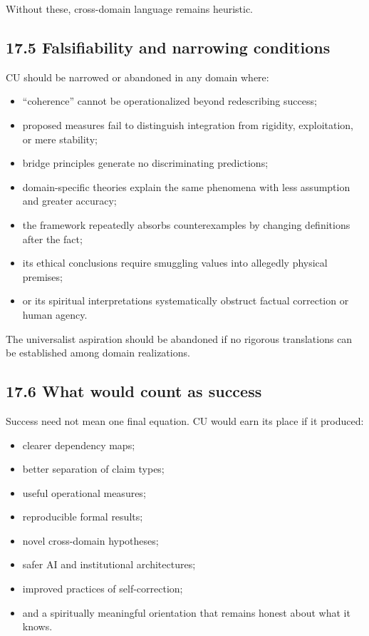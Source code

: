 \documentclass[
  11pt,
]{article}
\providecommand{\tightlist}{%
  \setlength{\itemsep}{0pt}\setlength{\parskip}{0pt}}
\begin{document}
Without these, cross-domain language remains heuristic.

\subsection{17.5 Falsifiability and narrowing
conditions}\label{falsifiability-and-narrowing-conditions}

CU should be narrowed or abandoned in any domain where:

\begin{itemize}
\tightlist
\item
  ``coherence'' cannot be operationalized beyond redescribing success;
\item
  proposed measures fail to distinguish integration from rigidity,
  exploitation, or mere stability;
\item
  bridge principles generate no discriminating predictions;
\item
  domain-specific theories explain the same phenomena with less
  assumption and greater accuracy;
\item
  the framework repeatedly absorbs counterexamples by changing
  definitions after the fact;
\item
  its ethical conclusions require smuggling values into allegedly
  physical premises;
\item
  or its spiritual interpretations systematically obstruct factual
  correction or human agency.
\end{itemize}

The universalist aspiration should be abandoned if no rigorous
translations can be established among domain realizations.

\subsection{17.6 What would count as
success}\label{what-would-count-as-success}

Success need not mean one final equation. CU would earn its place if it
produced:

\begin{itemize}
\tightlist
\item
  clearer dependency maps;
\item
  better separation of claim types;
\item
  useful operational measures;
\item
  reproducible formal results;
\item
  novel cross-domain hypotheses;
\item
  safer AI and institutional architectures;
\item
  improved practices of self-correction;
\item
  and a spiritually meaningful orientation that remains honest about
  what it knows.
\end{itemize}
\end{document}
